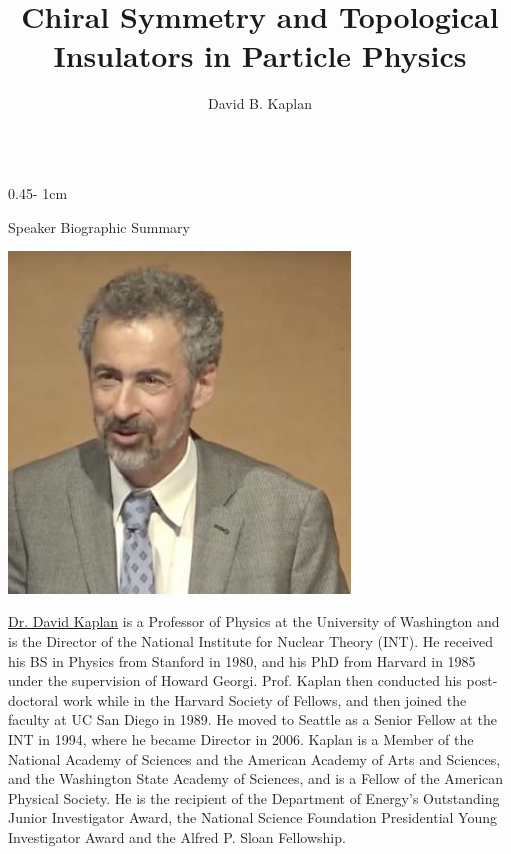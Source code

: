 \documentclass{../psuposter}
\title{Chiral Symmetry and Topological Insulators in Particle Physics}
\author{David B. Kaplan}
\institute{University of Washington}
\begin{document}
\begin{frame}
\begin{columns}[t, totalwidth=\textwidth]
\begin{column}{0.45\textwidth - 1cm}


    \begin{block}{Speaker Biographic Summary}
    	\begin{center}
    		\includegraphics[width=0.68\textwidth]{images/portrait}
    	\end{center}
    	\href{}{Dr. David Kaplan} is a Professor of Physics at the University of Washington and is the Director of the National Institute for Nuclear Theory (INT). He received his BS in Physics from Stanford in 1980, and his PhD from Harvard in 1985 under the supervision of Howard Georgi. Prof. Kaplan then conducted his post-doctoral work while in the Harvard Society of Fellows, and then joined the faculty at UC San Diego in 1989. He moved to Seattle as a Senior Fellow at the INT in 1994, where he became Director in 2006. Kaplan is a Member of the National Academy of Sciences and the American Academy of Arts and Sciences, and the Washington State Academy of Sciences, and is a Fellow of the American Physical Society. He is the recipient of the Department of Energy's Outstanding Junior Investigator Award, the National Science Foundation Presidential Young Investigator Award and the Alfred P. Sloan Fellowship.
    \end{block}



\end{column}
\end{columns}
\end{frame}
\end{document}
